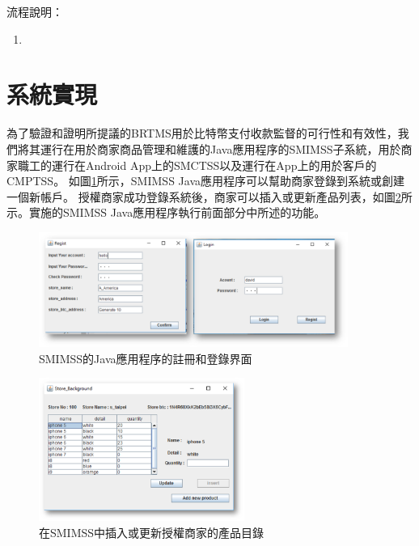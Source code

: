 	流程說明：

	\begin{enumerate}
	\item
	\end{enumerate}





\section{系統實現}


為了驗證和證明所提議的BRTMS用於比特幣支付收款監督的可行性和有效性，我們將其運行在用於商家商品管理和維護的Java應用程序的SMIMSS子系統，用於商家職工的運行在Android App上的SMCTSS以及運行在App上的用於客戶的CMPTSS。
如圖\ref{fig5}所示，SMIMSS Java應用程序可以幫助商家登錄到系統或創建一個新帳戶。 授權商家成功登錄系統後，商家可以插入或更新產品列表，如圖\ref{fig6}所示。實施的SMIMSS Java應用程序執行前面部分中所述的功能。

\begin{figure}[htbp]
	\centering
	\includegraphics[width = 0.9\textwidth]{fig5.png}
	\caption{SMIMSS的Java應用程序的註冊和登錄界面}\label{fig5}
\end{figure}

\begin{figure}[htbp]
	\centering
	\includegraphics[width = 0.6\textwidth]{fig6.png}
	\caption{在SMIMSS中插入或更新授權商家的產品目錄}\label{fig6}
\end{figure}

